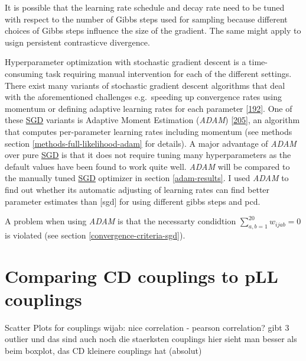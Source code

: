 \documentclass[11pt,a4paper,twoside]{book}
\newcommand{\wijab}{w_{ijab}}
\theoremstyle{definition}
\theoremstyle{definition}
\theoremstyle{remark}
\begin{document}
It is possible that the learning rate schedule and decay rate need to be
tuned with respect to the number of Gibbs steps used for sampling
because different choices of Gibbs steps influence the size of the
gradient. The same might apply to usign persistent contrasticve
divergence.

Hyperparameter optimization with stochastic gradient descent is a
time-consuming task requiring manual intervention for each of the
different settings. There exist many variants of stochastic gradient
descent algorithms that deal with the aforementioned challenges
e.g.~speeding up convergence rates using momentum or defining adaptive
learning rates for each parameter
{[}\protect\hyperlink{ref-Ruder2017}{192}{]}. One of these
\protect\hyperlink{abbrev}{SGD} variants is Adaptive Moment Estimation
(\emph{ADAM}) {[}\protect\hyperlink{ref-Kingma2014}{205}{]}, an
algorithm that computes per-parameter learning rates including momentum
(see methods section \ref{methods-full-likelihood-adam} for details). A
major advantage of \emph{ADAM} over pure \protect\hyperlink{abbrev}{SGD}
is that it does not require tuning many hyperparameters as the default
values have been found to work quite well. \emph{ADAM} will be compared
to the manually tuned \protect\hyperlink{abbrev}{SGD} optimizer in
section \ref{adam-results}. I used \emph{ADAM} to find out whether its
automatic adjusting of learning rates can find better parameter
estimates than {[}sgd{]} for using different gibbs steps and pcd.

A problem when using \emph{ADAM} is that the necessarty condidtion
\(\sum_{a,b=1}^{20} \wijab = 0\) is violated (see section
\ref{convergence-criteria-sgd}).

\section{Comparing CD couplings to pLL
couplings}\label{comparing-pll-cd}

Scatter Plots for couplings wijab: nice correlation - pearson
correlation? gibt 3 outlier und das sind auch noch die staerksten
couplings hier sieht man besser als beim boxplot, das CD kleinere
couplings hat (absolut)
\end{document}

